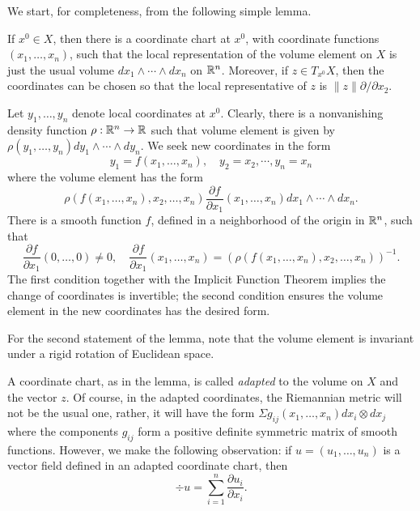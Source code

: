We start, for completeness, from the following simple lemma.
\begin{lem}
If  $x^0\in X$, then there is a coordinate chart at $x^0$,
with coordinate
functions $(x_1,\ldots,x_n)$, such that
the local representation of the volume element on $X$ is just the
usual volume $dx_1\wedge\cdots\wedge dx_n$ on ${\Bbb{R}}^n$.
Moreover, if $z\in T_{x^0}X$, then the coordinates
can be chosen so that the local representative of $z$  is
$\|z\|{\partial}/{\partial x_2}$.
\end{lem}
\begin{pf}
Let $y_1,\ldots,y_n$ denote local coordinates at $x^0$. Clearly,
there is a nonvanishing density function
$\rho:{\Bbb{R}}^n\to {\Bbb{R}}$ such
that volume element is given by
$\rho(y_1,\ldots,y_n)dy_1\wedge\cdots\wedge dy_n$.
We seek new coordinates
in the form
\[
y_1=f(x_1,\ldots,x_n),\quad y_2=x_2,\cdots,y_n=x_n
\]
where the volume element has the form
\[
\rho(f(x_1,\ldots,x_n),x_2,\ldots,x_n)
 \frac{\partial f}{\partial x_1}(x_1,\ldots,x_n)
 dx_1\wedge\cdots\wedge dx_n.
\]
There is a smooth function $f$, defined in a
neighborhood of the origin in ${\Bbb{R}}^n$, such that
\begin{equation*}
\frac{\partial f}{\partial x_1}(0,\ldots,0)\ne 0,\quad
\frac{\partial f}{\partial x_1}(x_1,\ldots,x_n)=
 (\rho(f(x_1,\ldots,x_n),x_2,\ldots,x_n))^{-1}.
\end{equation*}
The first condition together with  the Implicit Function Theorem
implies the change of coordinates is
invertible; the second condition
ensures the volume element in the new coordinates
has the desired form.

For the second statement of the lemma, note that the volume
element is invariant under a rigid rotation of Euclidean space.
\end{pf}

A coordinate chart, as in the lemma,
is called {\em adapted} to the volume on $X$ and the vector $z$.
Of course, in the adapted coordinates,
the Riemannian metric will not be the usual one, rather,
it will have the form $\Sigma g_{ij}(x_1,\ldots,x_n) dx_i\otimes dx_j$
where the components $g_{ij}$ form a positive definite symmetric
matrix of smooth functions. However, we make the following
observation: if
$u=(u_1,\ldots,u_n)$
is a vector field defined
in an adapted  coordinate chart, then
\begin{equation}
\label{divform}
\div u=\sum_{i=1}^n\frac{\partial u_i}{\partial x_i}.
\end{equation}

